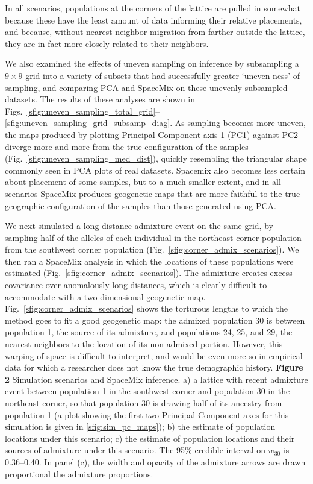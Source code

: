 \documentclass[10pt,letterpaper]{article}
\begin{document}
In all scenarios, populations at the corners of the lattice are pulled in somewhat
because these have the least amount of data informing their relative placements, and because, without nearest-neighbor migration from farther outside the lattice, they are in fact more closely related to their neighbors.  

We also examined the effects of uneven sampling on inference by 
subsampling a $9\times9$ grid into a variety of subsets that had successfully greater `uneven-ness' of sampling,
and comparing PCA and SpaceMix on these unevenly subsampled datasets.
The results of these analyses are shown in Figs.\ \ref{sfig:uneven_sampling_total_grid}--\ref{sfig:uneven_sampling_grid_subsamp_diag}.  
As sampling becomes more uneven,
the maps produced by plotting Principal Component axis 1 (PC1) against PC2 diverge more and more from 
the true configuration of the samples (Fig.\ \ref{sfig:uneven_sampling_med_dist}),
quickly resembling the triangular shape commonly seen in PCA plots of real datasets.
Spacemix also becomes less certain about placement of some samples,
but to a much smaller extent, and in all scenarios SpaceMix produces geogenetic maps that are more 
faithful to the true geographic configuration of the samples than those generated using PCA. 

We next simulated a long-distance admixture event on the same grid,
by sampling half of the alleles of each individual in the northeast corner population from the southwest corner population (Fig.\ \ref{sfig:corner_admix_scenarios}).  We then ran a SpaceMix analysis in which the locations of these populations were estimated (Fig.\ \ref{sfig:corner_admix_scenarios}).
The admixture creates excess covariance over anomalously long distances, which is clearly difficult to accommodate with a two-dimensional geogenetic map.
Fig.\ \ref{sfig:corner_admix_scenarios} shows the torturous lengths to which the method goes to fit a good geogenetic map: the admixed population 30 is between population 1, the source of its admixture, and populations 24, 25, and 29, the nearest neighbors to the location of its non-admixed portion.
However, this warping of space is difficult to interpret, and would be even more so in empirical data for which a researcher does not know the true demographic history.  
%
\newline\newline
{\bf{Figure 2}} Simulation scenarios and SpaceMix inference.  a) a lattice with recent admixture event between population 1 in the southwest corner and population 30 in the northeast corner, so that population 30 is drawing half of its ancestry from population 1 (a plot showing the first two Principal Component axes for this simulation is given in \ref{sfig:sim_pc_maps}); b) the estimate of population locations under this scenario; c) the estimate of population locations and their sources of admixture under this scenario.  The 95\% credible interval on $w_{30}$ is 0.36--0.40. In panel (c), the width and opacity of the admixture arrows are drawn proportional the admixture proportions.
\newline\newline
\end{document}
